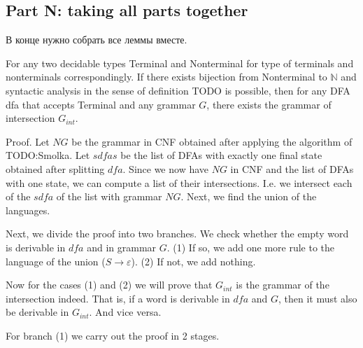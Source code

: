 \subsection{ Part N: taking all parts together}

В конце нужно собрать все леммы вместе.


\begin{theorem}
    For any two decidable types Terminal and Nonterminal for type of terminals and nonterminals correspondingly. If there exists bijection from Nonterminal to $\mathbb{N}$ and syntactic analysis in the sense of definition TODO is possible, then for any DFA dfa that accepts Terminal and any grammar $G$, there exists the grammar of intersection $G_{int}$.
\end{theorem}   

Proof. 
Let $NG$ be the grammar in CNF obtained after applying the algorithm of TODO:Smolka. Let $sdfas$ be the list of DFAs with exactly one final state obtained after splitting $dfa$.
Since we now have $NG$ in CNF and the list of DFAs with one state, we can compute a list of their intersections.
I.e. we intersect each of the $sdfa$ of the list with grammar $NG$.
Next, we find the union of the languages. 

Next, we divide the proof into two branches.
We check whether the empty word is derivable in $dfa$ and in grammar $G$.
(1) If so, we add one more rule to the language of the union ($ S \to \varepsilon$). (2) If not, we add nothing.

Now for the cases (1) and (2) we will prove that $G_{int}$ is the grammar of the intersection indeed.
That is, if a word is derivable in $dfa$ and $G$, then it must also be derivable in $G_{int}$. And vice versa.

For branch (1) we carry out the proof in 2 stages.

